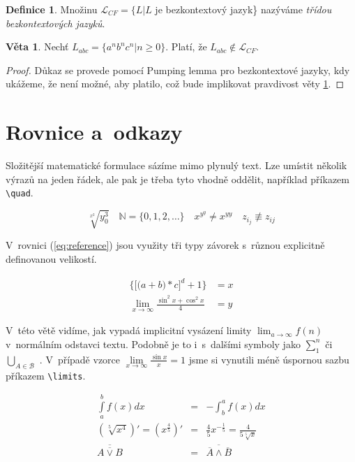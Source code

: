 \documentclass[a4paper,11pt,twocolumn]{article}
\theoremstyle{definition}
\newtheorem{definition}{Definice}[section]
\newtheorem{veta}{Věta}
\begin{document}
\begin{definition} \label{def4}
Množinu $\mathcal{L}_{CF} = \{L|L$ je bezkontextový jazyk\} nazýváme \emph{třídou bezkontextových jazyků}.
\end{definition}

\begin{veta} \label{veta}
Nechť $L_{abc} = \{a^n b^n c^n | n \geq 0 \}$. Platí, že $L_{abc} \notin \mathcal{L}_{CF}$.
\end{veta} 

\begin{proof} \label{dukaz} 
Důkaz se provede pomocí Pumping lemma pro bezkontextové jazyky, kdy ukážeme, že není možné, aby platilo, což bude implikovat pravdivost věty \ref{veta}.
\end{proof}

\section{Rovnice a~odkazy}

Složitější matematické formulace sázíme mimo plynulý text. Lze umístit několik výrazů na jeden řádek, ale pak je třeba tyto vhodně oddělit, například příkazem \verb|\quad|. 
 
$$\sqrt[x^2]{y^3_0} \quad \mathbb{N} = \{0, 1, 2,\ldots\} \quad x^{y^y} \neq x^{yy} \quad z_{i_j} \not\equiv z_{ij}$$

V~rovnici (\ref{eq:reference}) jsou využity tři typy závorek s~různou explicitně definovanou velikostí.

\begin{eqnarray}   \label{eq:reference}
 \bigg\{ \Big[ \big( a+b \big) *c \Big]^d +1 \bigg\} &= x\\
 \lim\limits_{x \rightarrow \infty} \displaystyle{\frac{\sin^2 x + \cos^2 x}{4}} &= y \nonumber
\end{eqnarray}

V~této větě vidíme, jak vypadá implicitní vysázení limity $\lim\nolimits_{a \to \infty}f(n)$ v~normálním odstavci textu. Podobně je to i~s~dalšími symboly jako $\sum^n_1$ či $\bigcup_{A \in \mathcal{B}}$ . V~případě vzorce $\lim\limits_{x \to \infty} \frac{\sin x}{x} = 1$ jsme si vynutili méně úspornou sazbu příkazem \verb|\limits|.

\begin{eqnarray}
 \int\limits_{a}^{b} f(x) dx & = & - \int_b^a f(x) dx \\ (\sqrt[5]{x^4})' = (x^{\frac{4}{5}})' & = & \displaystyle{\frac{4}{5}}x^{-\frac{1}{5}} = \displaystyle{\frac{4}{5\sqrt[5]{x}}} \\
 \overline{\overline{A \vee B}} & = & \overline{\overline{A} \wedge \overline{B}}
\end{eqnarray}
\end{document}
